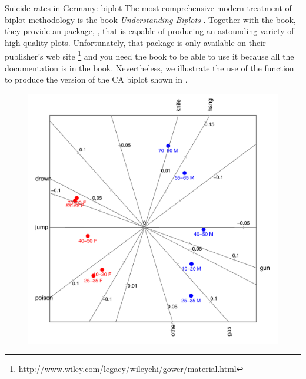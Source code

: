 \documentclass[11pt]{book}
\renewenvironment{knitrout}{\small\renewcommand{\baselinestretch}{.85}}{} %
\begin{document}
\begin{Example}[suicide3]{Suicide rates in Germany: biplot}
The most comprehensive modern treatment of biplot methodology is the book
\emph{Understanding Biplots} \citep{Gower-etal:2011}.
Together with the book, they provide an \R package, ,
that is capable of producing an astounding variety of high-quality plots.
Unfortunately, that package is only available on their publisher's web site%
\footnote{
\url{http://www.wiley.com/legacy/wileychi/gower/material.html}
}
and you need the book to be able to use it because all the documentation is in the book.
Nevertheless, we illustrate the use of the  function to produce the
version of the CA biplot shown in .
\begin{knitrout}
\color{fgcolor}\begin{kframe}
\begin{alltt}
\hlstd{(}
     \hlstd{=} \hlstd{(}\hlstd{),} \hlstd{=}\hlstd{,}
     \hlstd{=} \hlstd{,}
     \hlstd{=} \hlstd{,}
     \hlstd{=} \hlstd{,}
     \hlstd{=} \hlstd{(}\hlstd{(}\hlstd{,} \hlstd{),} \hlstd{),}
     \hlstd{=} \hlstd{,}
     \hlstd{=} \hlstd{,} \hlstd{=}\hlstd{,}
     \hlstd{=} \hlstd{(}\hlstd{,} \hlstd{,} \hlstd{,} \hlstd{),}
     \hlstd{=} \hlstd{(}\hlopt{-}\hlstd{,} \hlstd{),}
    \hlstd{=}\hlstd{)}
\end{alltt}
\end{kframe}
\end{knitrout}
\begin{figure}[!htb]
\centering
\includegraphics[width=.8\textwidth]{ch06/fig/cabipl-suicide}

\end{figure}
\end{Example}
\end{document}
